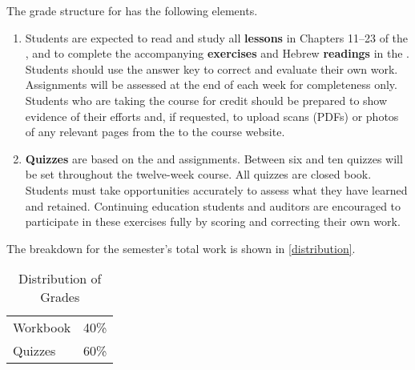\documentclass[titlepage]{article}
\begin{document}
The grade structure for \ccode has the following elements.

\begin{enumerate}
 \item
    Students are expected to read and study all \textbf{lessons} in
    Chapters 11–23 of the \cite{lbh}, and to complete the accompanying
    \textbf{exercises} and Hebrew \textbf{readings} in the \cite{work}.
    Students should use the answer key to correct and evaluate their own
    work. Assignments will be assessed at the end of each week for
    completeness only. Students who are taking the course for credit
    should be prepared to show evidence of their efforts and, if
    requested, to upload scans (PDFs) or photos of any relevant pages
    from the \cite{work} to the course website.
 \item
    \textbf{Quizzes} are based on the \cite{lbh} and \cite{work}
    assignments. Between six and ten quizzes will be set throughout the
    twelve-week course. All quizzes are closed book. Students must take
    opportunities accurately to assess what they have learned and
    retained. Continuing education students and auditors are encouraged
    to participate in these exercises fully by scoring and correcting
    their own work.

\end{enumerate}

The breakdown for the semester's total work is shown in
\autoref{distribution}.

\begin{table}[htbp]
  \centering
  {\lining
  \begin{tabular}{lr}
    \toprule
    Workbook & 40\% \\
    Quizzes  & 60\% \\
    \bottomrule
  \end{tabular}}
  \caption{Distribution of Grades}
  \label{distribution}
\end{table}
\end{document}
